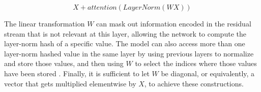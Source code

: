 \[X + attention(LayerNorm(W X))\]

The linear transformation $W$ can mask out information encoded in the residual stream that is not relevant at this layer, allowing the network to compute the layer-norm hash of a specific value.
The model can also access more than one layer-norm hashed value in the same layer by using previous layers to normalize and store those values, and then using $W$ to select the indices where those values have been stored \citep{merrill-sabharwal-2024-cot}.
Finally, it is sufficient to let $W$ be diagonal, or equivalently, a vector that gets multiplied elementwise by $X$, to achieve these constructions.
